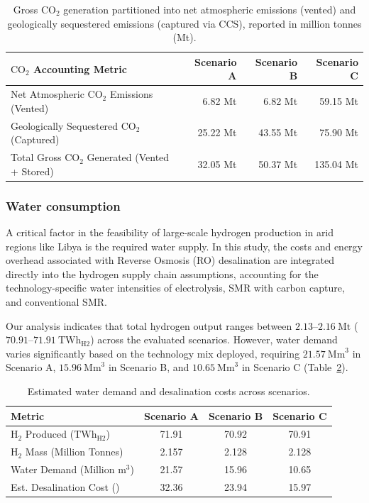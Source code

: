 \documentclass[preprint,12pt]{elsarticle}
\begin{document}
\begin{table}[htbp]
\centering
\caption{Gross $\text{CO}_2$ generation partitioned into net atmospheric emissions (vented) and geologically sequestered emissions (captured via CCS), reported in million tonnes (Mt).}
\label{tab:co2_mass_balance}
\begin{tabular}{lrrr}
\toprule
{$\text{CO}_2$ Accounting Metric} & {Scenario A} & {Scenario B} & {Scenario C} \\ \midrule
Net Atmospheric $\text{CO}_2$ Emissions (Vented) & 6.82 Mt & 6.82 Mt & 59.15 Mt \\
Geologically Sequestered $\text{CO}_2$ (Captured) & 25.22 Mt & 43.55 Mt & 75.90 Mt \\ \midrule
Total Gross $\text{CO}_2$ Generated (Vented + Stored) & 32.05 Mt & 50.37 Mt & 135.04 Mt \\ \bottomrule
\end{tabular}
\end{table}


\subsubsection{Water consumption}
\label{sec:desalination}
A critical factor in the feasibility of large-scale hydrogen production in arid regions like Libya is the required water supply. In this study, the costs and energy overhead associated with Reverse Osmosis (RO) desalination are integrated directly into the hydrogen supply chain assumptions, accounting for the technology-specific water intensities of electrolysis, SMR with carbon capture, and conventional SMR.

Our analysis indicates that total hydrogen output ranges between $2.13\text{--}2.16~\text{Mt}$ ($70.91\text{--}71.91~\text{TWh}_{\text{H2}}$) across the evaluated scenarios. However, water demand varies significantly based on the technology mix deployed, requiring $21.57~\text{Mm}^3$ in Scenario A, $15.96~\text{Mm}^3$ in Scenario B, and $10.65~\text{Mm}^3$ in Scenario C (Table~\ref{tab:water_demand}).

\begin{table}[htbp]
\centering
\caption{Estimated water demand and desalination costs across scenarios.}
\label{tab:water_demand}
\begin{tabular}{lccc}
\toprule
Metric & Scenario A & Scenario B & Scenario C \\
\midrule
$\text{H}_2$ Produced ($\text{TWh}_{\text{H2}}$) & 71.91 & 70.92 & 70.91 \\
$\text{H}_2$ Mass (Million Tonnes) & 2.157 & 2.128 & 2.128 \\
Water Demand (Million $\text{m}^3$) & 21.57 & 15.96 & 10.65 \\
Est. Desalination Cost (\text{M\texteuro/yr}) & 32.36 & 23.94 & 15.97 \\
\bottomrule
\end{tabular}
\end{table}
\end{document}
